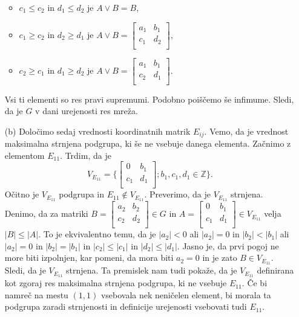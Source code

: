 \documentclass[a4paper, 12pt]{article}
\newcommand{\Z}{\mathbb{Z}}
\begin{document}
\begin{enumerate}
\begin{itemize}
\item $c_1 \le c_2$ in $d_1 \le d_2$ je $A\lor B = B$,
\item $c_1 \ge c_2$ in $d_2 \ge d_1$ je  $A\lor B=
\begin{bmatrix}
a_1 & b_1\\
c_1 & d_2 \\
\end{bmatrix}$,
\item $c_2 \ge c_1$ in $d_1 \ge d_2$ je  $A\lor B=
\begin{bmatrix}
a_1 & b_1\\
c_2 & d_1 \\
\end{bmatrix}$.
\end{itemize}
Vsi ti elementi so res pravi supremumi. Podobno poiščemo še infimume. Sledi, da je $G$ v dani urejenosti res mreža.
\item[(b)] Določimo sedaj vrednosti koordinatnih matrik $E_{ij}$. Vemo, da je vrednost maksimalna strnjena podgrupa, ki še ne vsebuje danega elementa. Začnimo z elementom $E_{11}$. Trdim, da je 
$$
V_{E_{11}} = 	\big\{ 
\begin{bmatrix}
0 & b_1 \\
c_1 & d_1 \\
\end{bmatrix}; b_1,c_1,d_1 \in \Z
  \big\}.
$$
Očitno je $V_{E_{11}}$ podgrupa in $E_{11}\notin V_{E_{11}}$. Preverimo, da je $V_{E_{11}}$ strnjena. Denimo, da za matriki 
$B=\begin{bmatrix}
a_2 & b_2\\
c_2 & d_2\\
\end{bmatrix}
\in G
$
in
$
A=\begin{bmatrix}
0 & b_1\\
c_1 & d_1\\
\end{bmatrix}
\in V_{E_{11}}
$
velja $|B| \le |A|$. To je ekvivalentno temu, da je $|a_2| < 0 $ ali $|a_2| = 0$ in $|b_2| < |b_1|$ ali $|a_2| = 0$ in $|b_2| = |b_1| $ in $|c_2| \le |c_1|$ in $|d_2| \le |d_1|$. Jasno je, da prvi pogoj ne more biti izpolnjen, kar pomeni, da mora biti $a_2 = 0$ in je zato $B\in V_{E_{11}}$. Sledi, da je $V_{E_{11}}$ strnjena. Ta premislek nam tudi pokaže, da je $V_{E_{11}}$ definirana kot zgoraj res maksimalna strnjena podgrupa, ki ne vsebuje $E_{11}$. Če bi namreč na mestu $(1,1)$ vsebovala nek neničelen element, bi morala ta podgrupa zaradi strnjenosti in  definicije urejenosti vsebovati tudi $E_{11}$.


\end{enumerate}
\end{document}
